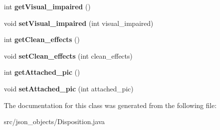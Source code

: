 \begin{DoxyCompactItemize}
\item 
\hypertarget{classjson__objects_1_1_disposition_a391cac0517a92b170d1e65d6195074d8}{
int {\bfseries getVisual\_\-impaired} ()}
\label{classjson__objects_1_1_disposition_a391cac0517a92b170d1e65d6195074d8}

\item 
\hypertarget{classjson__objects_1_1_disposition_a6f8c92b94aec3c54886ba79e527cd613}{
void {\bfseries setVisual\_\-impaired} (int visual\_\-impaired)}
\label{classjson__objects_1_1_disposition_a6f8c92b94aec3c54886ba79e527cd613}

\item 
\hypertarget{classjson__objects_1_1_disposition_a7a69b78a0762f86edaf65b8f4ce97cc5}{
int {\bfseries getClean\_\-effects} ()}
\label{classjson__objects_1_1_disposition_a7a69b78a0762f86edaf65b8f4ce97cc5}

\item 
\hypertarget{classjson__objects_1_1_disposition_ab894366c7c42d76f864bbfb752a137d3}{
void {\bfseries setClean\_\-effects} (int clean\_\-effects)}
\label{classjson__objects_1_1_disposition_ab894366c7c42d76f864bbfb752a137d3}

\item 
\hypertarget{classjson__objects_1_1_disposition_a91e1380fa103e0efbd4ebd54279b57ae}{
int {\bfseries getAttached\_\-pic} ()}
\label{classjson__objects_1_1_disposition_a91e1380fa103e0efbd4ebd54279b57ae}

\item 
\hypertarget{classjson__objects_1_1_disposition_ac2d5c4385559c51880b64bed7978dd6e}{
void {\bfseries setAttached\_\-pic} (int attached\_\-pic)}
\label{classjson__objects_1_1_disposition_ac2d5c4385559c51880b64bed7978dd6e}

\end{DoxyCompactItemize}


The documentation for this class was generated from the following file:\begin{DoxyCompactItemize}
\item 
src/json\_\-objects/Disposition.java\end{DoxyCompactItemize}
